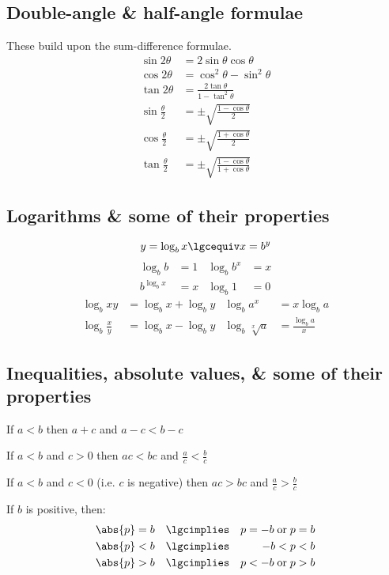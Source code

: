 \documentclass[10pt]{extarticle}
\theoremstyle{definition}
\begin{document}
\begin{multicols}{2}
		\subsection*{Double-angle \& half-angle formulae}
		These build upon the sum-difference formulae.
		\begin{align*}
			\sin{2\theta} &= 2\sin{\theta}\cos{\theta} \\
			\cos{2\theta} &= \cos^2{\theta} - \sin^2{\theta} \\
			\tan{2\theta} &= \frac{2\tan{\theta}}{1 - \tan^2\theta} \\
			\sin{\frac{\theta}{2}} &= \pm \sqrt{\frac{1 - \cos\theta}{2}} \\
			\cos{\frac{\theta}{2}} &= \pm \sqrt{\frac{1 + \cos\theta}{2}}\\
			\tan{\frac{\theta}{2}} &= \pm \sqrt{\frac{1 - \cos\theta}{1 + \cos\theta}}
		\end{align*}

		\subsection*{Logarithms \& some of their properties}
		\[y = \log_{b}x \lgcequiv x = b^{y}\]
		\begin{align*}
			\log_{b}{b} &= 1 & \log_{b}{b^x} &= x \\
			b^{\log_{b}{x}} &= x & \log_{b}{1} &= 0
		\end{align*}
		\begin{align*}
			\log_{b}{xy} &= \log_{b}{x} + \log_{b}{y} & \log_{b}{a^x} &= x \log_{b}{a} \\
			\log_{b}{\frac{x}{y}} &= \log_{b}{x} - \log_{b}{y} & \log_{b}{\sqrt[x]{a}} &= \frac{\log_{b}{a}}{x}
		\end{align*}

		\subsection*{Inequalities, absolute values, \& some of their properties}
		If \(a < b\) then \(a + c\) and \(a - c < b - c\)

		If \(a < b\) and \(c > 0\) then \(ac < bc\) and \(\frac{a}{c} < \frac{b}{c}\)

		If \(a < b\) and \(c < 0\) (i.e. \(c\) is negative) then \(ac > bc\) and \(\frac{a}{c} > \frac{b}{c}\)

		If \(b\) is positive, then:
		\begin{align*}  %
			\abs{p} &= b &\lgcimplies && p = -b \; \text{or} \; p = b \\
			\abs{p} &< b &\lgcimplies && -b < p < b \\
			\abs{p} &> b &\lgcimplies && p < -b \; \text{or} \; p > b
		\end{align*}
	\end{multicols}
	\pagebreak
\end{document}
